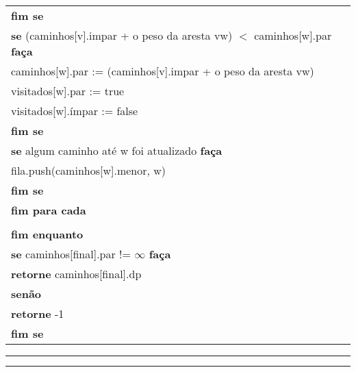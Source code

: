 \documentclass[12pt]{article}
\begin{document}
\begin{tabular}{l}
			\indent \indent \textbf{fim se} \\
			\indent \indent \textbf{se} (caminhos[v].impar + o peso da aresta vw) $<$ caminhos[w].par \textbf{faça} \\
			\indent \indent \indent caminhos[w].par := (caminhos[v].impar + o peso da aresta vw) \\
			\indent \indent \indent visitados[w].par := true \\
			\indent \indent \indent visitados[w].ímpar := false \\
			\indent \indent \textbf{fim se} \\
			\indent \indent \textbf{se} algum caminho até w foi atualizado \textbf{faça} \\
			\indent \indent \indent fila.push(caminhos[w].menor, w) \\
			\indent \indent \textbf{fim se} \\
			\indent \textbf{fim para cada} \\ \\
			\textbf{fim enquanto} \\
			\textbf{se} caminhos[final].par != $\infty$ \textbf{faça} \\
			\indent \textbf{retorne} caminhos[final].dp \\
			\textbf{senão} \\
			\indent \textbf{retorne} -1 \\
			\textbf{fim se} \\
		\end{tabular}
		\hrule
		\vspace{3pt}
		\hrule
\end{document}
